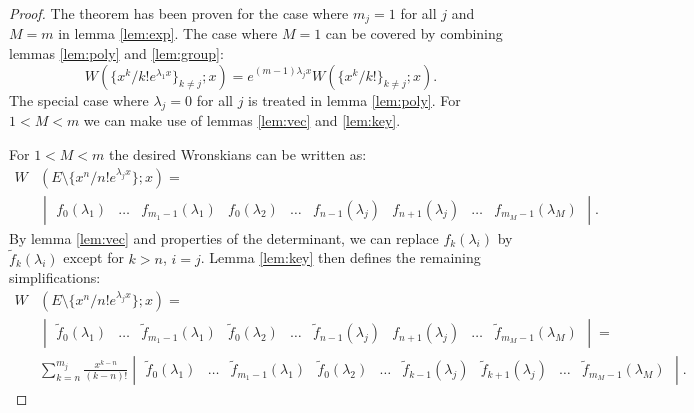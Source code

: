 \documentclass{book}
\begin{document}
\begin{proof}
The theorem has been proven for the case where $m_j = 1$ for all $j$ and $M = m$ in lemma \ref{lem:exp}.
The case where $M = 1$ can be covered by combining lemmas \ref{lem:poly} and \ref{lem:group}:
\begin{equation*}
W(\{ x^k/k! e^{\lambda_1 x} \}_{k\neq j} ; x) = e^{(m-1) \lambda_j x} W(\{x^k/k!\}_{k \neq j} ; x) .
\end{equation*}
The special case where $\lambda_j = 0$ for all $j$ is treated in lemma \ref{lem:poly}.
For $1 < M < m$ we can make use of lemmas \ref{lem:vec} and \ref{lem:key}.

For $1 < M < m$ the desired Wronskians can be written as:
\begin{align*}
W& (E \setminus \{ x^n/n! e^{\lambda_j x} \} ; x) = \\
& \begin{vmatrix} f_0(\lambda_1) & \dots & f_{m_1-1}(\lambda_1) & f_0(\lambda_2) & \dots
& f_{n-1}(\lambda_j) & f_{n+1}(\lambda_j) & \dots & f_{m_M-1}(\lambda_M) \end{vmatrix} .
\end{align*}
By lemma \ref{lem:vec} and properties of the determinant, we can replace $f_k(\lambda_i)$ by $\tilde{f}_k(\lambda_i)$ except for $k>n$, $i=j$.
Lemma \ref{lem:key} then defines the remaining simplifications:
\begin{align*}
W & (E \setminus \{ x^n/n! e^{\lambda_j x} \} ; x) = \\
& \begin{vmatrix} \tilde{f}_0(\lambda_1) & \dots & \tilde{f}_{m_1-1}(\lambda_1) & \tilde{f}_0(\lambda_2) & \dots
& \tilde{f}_{n-1}(\lambda_j) & f_{n+1}(\lambda_j) & \dots & \tilde{f}_{m_M-1}(\lambda_M) \end{vmatrix} = \\
& \sum_{k=n}^{m_j} \frac{x^{k-n}}{(k-n)!} \begin{vmatrix} \tilde{f}_0(\lambda_1) & \dots & \tilde{f}_{m_1-1}(\lambda_1) & \tilde{f}_0(\lambda_2) & \dots
& \tilde{f}_{k-1}(\lambda_j) & \tilde{f}_{k+1}(\lambda_j) & \dots & \tilde{f}_{m_M-1}(\lambda_M) \end{vmatrix} .
\end{align*}
\end{proof}
\end{document}
